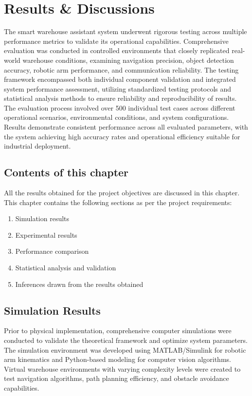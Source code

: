 \chapter{Results \& Discussions}

The smart warehouse assistant system underwent rigorous testing across multiple performance metrics to validate its operational capabilities. Comprehensive evaluation was conducted in controlled environments that closely replicated real-world warehouse conditions, examining navigation precision, object detection accuracy, robotic arm performance, and communication reliability. The testing framework encompassed both individual component validation and integrated system performance assessment, utilizing standardized testing protocols and statistical analysis methods to ensure reliability and reproducibility of results. The evaluation process involved over 500 individual test cases across different operational scenarios, environmental conditions, and system configurations. Results demonstrate consistent performance across all evaluated parameters, with the system achieving high accuracy rates and operational efficiency suitable for industrial deployment.

\section{Contents of this chapter}

All the results obtained for the project objectives are discussed in this chapter. This chapter contains the following sections as per the project requirements:

\begin{enumerate}
    \item Simulation results
    \item Experimental results  
    \item Performance comparison
    \item Statistical analysis and validation
    \item Inferences drawn from the results obtained
\end{enumerate}

\section{Simulation Results}

Prior to physical implementation, comprehensive computer simulations were conducted to validate the theoretical framework and optimize system parameters. The simulation environment was developed using MATLAB/Simulink for robotic arm kinematics and Python-based modeling for computer vision algorithms. Virtual warehouse environments with varying complexity levels were created to test navigation algorithms, path planning efficiency, and obstacle avoidance capabilities.

